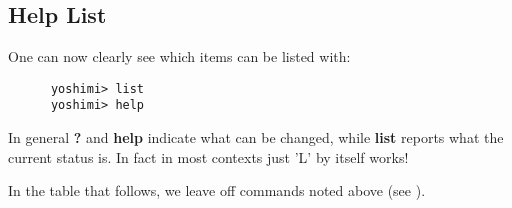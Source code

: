 \subsection{Help List}
\label{subsec:command_line_help_list}

   One can now clearly see which items can be listed with:

   \begin{verbatim}
      yoshimi> list
      yoshimi> help
   \end{verbatim}

   In general \textbf{?} and \textbf{help} indicate what can be changed, while
   \textbf{list} reports what the current status is. In fact in most contexts just 'L' by itself works!

   In the table that follows, we leave off commands noted above
   (see ).

